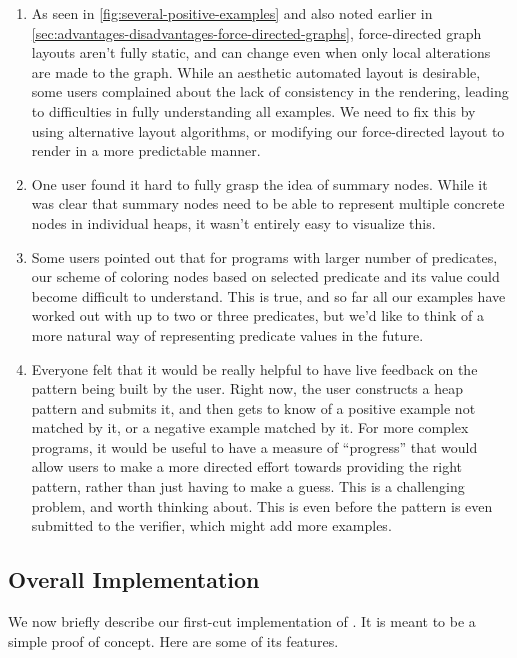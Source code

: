 \begin{enumerate}
  \item As seen in \autoref{fig:several-positive-examples} and also noted earlier in \autoref{sec:advantages-disadvantages-force-directed-graphs}, force-directed graph layouts aren't fully static, and can change even when only local alterations are made to the graph. While an aesthetic automated layout is desirable, some users complained about the lack of consistency in the rendering, leading to difficulties in fully understanding all examples. We need to fix this by using alternative layout algorithms, or modifying our force-directed layout to render in a more predictable manner.
  \item One user found it hard to fully grasp the idea of summary nodes. While it was clear that summary nodes need to be able to represent multiple concrete nodes in individual heaps, it wasn't entirely easy to visualize this.
  \item Some users pointed out that for programs with larger number of predicates, our scheme of coloring nodes based on selected predicate and its value could become difficult to understand. This is true, and so far all our examples have worked out with up to two or three predicates, but we'd like to think of a more natural way of representing predicate values in the future.
  \item Everyone felt that it would be really helpful to have live feedback on the pattern being built by the user. Right now, the user constructs a heap pattern and submits it, and then gets to know of a positive example not matched by it, or a negative example matched by it. For more complex programs, it would be useful to have a measure of ``progress'' that would allow users to make a more directed effort towards providing the right pattern, rather than just having to make a guess. This is a challenging problem, and worth thinking about. This is even before the pattern is even submitted to the verifier, which might add more examples.
\end{enumerate}

\subsection{Overall Implementation}
We now briefly describe our first-cut implementation of \verifier. It is meant to be
a simple proof of concept. Here are some of its features.

